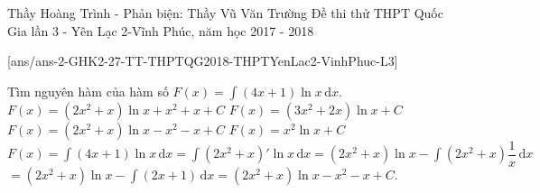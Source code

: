 
\begin{name}
	{Thầy Hoàng Trình - Phản biện: Thầy Vũ Văn Trường}
	{Đề thi thử THPT Quốc Gia lần 3 - Yên Lạc 2-Vĩnh Phúc, năm học 2017 - 2018}
\end{name}
\setcounter{ex}{0}
[ans/ans-2-GHK2-27-TT-THPTQG2018-THPTYenLac2-VinhPhuc-L3]

\begin{ex}%
	Tìm nguyên hàm của hàm số $F(x)=\displaystyle\int{\left(4x+1\right)\ln x\mathrm{\,d}x}$.
	\choice
	{$F(x)=\left(2x^2+x\right)\ln x+x^2+x+C$}
	{$F(x)=\left(3x^2+2x\right)\ln x+C$}
	{\True $F(x)=\left(2x^2+x\right)\ln x-x^2-x+C$}
	{$F(x)=x^2\ln x+C$}
	\loigiai
	{
		$F(x)=\displaystyle\int{\left(4x+1\right)\ln x\mathrm{\,d}x}=\displaystyle\int{(2x^2+x)'\ln x\mathrm{\,d}x}=(2x^2+x)\ln x
		-\displaystyle\int{(2x^2+x)\dfrac{1}{x}\mathrm{\,d}x}$\\
		$=(2x^2+x)\ln x-\displaystyle\int{(2x+1)\mathrm{\,d}x}= (2x^2+x)\ln x - x^2-x+C.$
	}
	
\end{ex}

